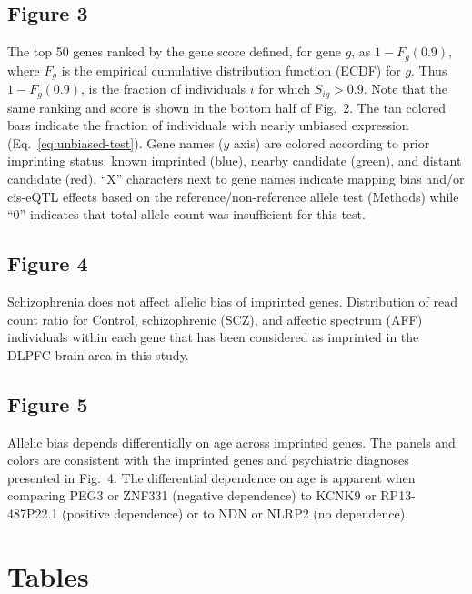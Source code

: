 \documentclass[letterpaper]{article}
\begin{document}
\subsection*{Figure 3}

The top 50 genes ranked by the gene score defined, for gene \(g\), as \(1 -
F_g(0.9)\), where \(F_g\) is the empirical cumulative distribution function
(ECDF) for \(g\).  Thus \(1 - F_g(0.9)\), is the fraction of individuals \(i\)
for which \(S_{ig}>0.9\).  Note that the same ranking and score is shown in
the bottom half of Fig.~2.  The tan colored bars
indicate the fraction of individuals with nearly unbiased expression
(Eq.~\ref{eq:unbiased-test}).  Gene names (\(y\) axis) are colored according
to prior imprinting status: known imprinted (blue), nearby candidate (green),
and distant candidate (red).  ``X'' characters next to gene names indicate
mapping bias and/or cis-eQTL effects based on the reference/non-reference
allele test (Methods) while ``0'' indicates that total allele count was
insufficient for this test.

\subsection*{Figure 4}

Schizophrenia does not affect allelic bias of imprinted genes.
Distribution of read count ratio for Control, schizophrenic (SCZ), and
affectic spectrum (AFF) individuals within each gene that has been considered as imprinted in the DLPFC
brain area in this study.

\subsection*{Figure 5}

Allelic bias depends differentially on age across imprinted genes.
The panels and colors are consistent with the imprinted genes and psychiatric diagnoses
presented in Fig.~4.  The differential dependence on age is apparent
when comparing PEG3 or ZNF331 (negative dependence) to KCNK9 or RP13-487P22.1
(positive dependence) or to NDN or NLRP2 (no dependence).

\section*{Tables}
\end{document}
